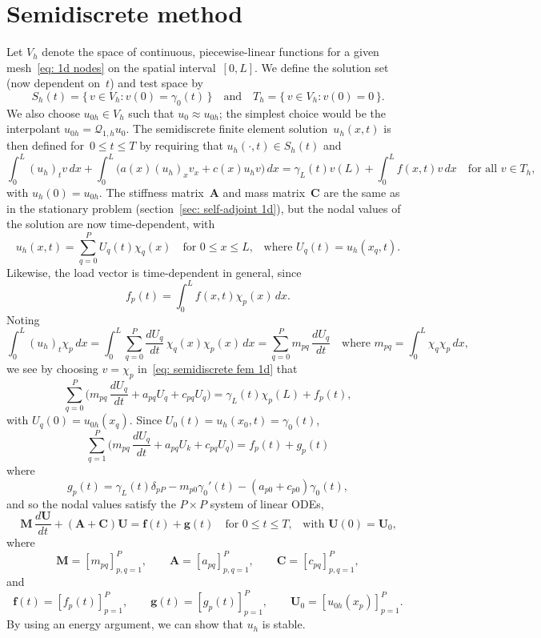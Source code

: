 \section{Semidiscrete method}\label{sec: semidiscrete parabolic FEM}
Let $V_h$ denote the space of continuous, piecewise-linear functions for a 
given mesh~\eqref{eq: 1d nodes} on the spatial interval~$[0,L]$.  We define the 
solution set (now dependent on~$t$) and test space by
\[
S_h(t)=\{\,v\in V_h:v(0)=\gamma_0(t)\,\}
\quad\text{and}\quad
T_h=\{\,v\in V_h:v(0)=0\,\}.
\]
We also choose $u_{0h}\in V_h$ such that $u_0\approx u_{0h}$; the simplest 
choice would be the interpolant $u_{0h}=\mathcal{Q}_{1,h}u_0$. The semidiscrete
finite element solution~$u_h(x,t)$ is then defined for~$0\le t\le T$ by 
requiring that $u_h(\cdot,t)\in S_h(t)$ and
\begin{equation}\label{eq: semidiscrete fem 1d}
\int_0^L(u_h)_tv\,dx+\int_0^L\bigl(a(x)(u_h)_xv_x+c(x)u_hv\bigr)\,dx
    =\gamma_L(t)v(L)+\int_0^Lf(x,t)v\,dx
\quad\text{for all $v\in T_h$,}
\end{equation}
with $u_h(0)=u_{0h}$. The stiffness matrix~$\boldsymbol{A}$ and mass 
matrix~$\boldsymbol{C}$ are the same as in the stationary problem 
(section~\ref{sec: self-adjoint 1d}), but the nodal 
values of the solution are now time-dependent, with
\[
u_h(x,t)=\sum_{q=0}^P U_q(t)\chi_q(x)\quad\text{for $0\le x\le L$,}\quad
\text{where $U_q(t)=u_h(x_q,t)$.}
\]
Likewise, the load vector is time-dependent in general, since 
\[
f_p(t)=\int_0^Lf(x,t)\chi_p(x)\,dx.
\]
Noting 
\[
\int_0^L(u_h)_t\chi_p\,dx=\int_0^L\sum_{q=0}^P
    \frac{dU_q}{dt}\,\chi_q(x)\chi_p(x)\,dx=\sum_{q=0}^P m_{pq}\,\frac{dU_q}{dt}
    \quad\text{where $m_{pq}=\int_0^L\chi_q\chi_p\,dx$,}
\]
we see by choosing $v=\chi_p$ in~\eqref{eq: semidiscrete fem 1d} that
\[
\sum_{q=0}^P\biggl(m_{pq}\,\frac{dU_q}{dt}+a_{pq}U_q+c_{pq}U_q\biggr)
    =\gamma_L(t)\chi_p(L)+f_p(t),
\]
with $U_q(0)=u_{0h}(x_q)$.  Since $U_0(t)=u_h(x_0,t)=\gamma_0(t)$,
\[
\sum_{q=1}^P\biggl(m_{pq}\,\frac{dU_q}{dt}+a_{pq}U_k+c_{pq}U_q\biggr)
    =f_p(t)+g_p(t)
\]
where
\[
g_p(t)=\gamma_L(t)\delta_{pP}-m_{p0}\gamma_0'(t)-(a_{p0}+c_{p0})\gamma_0(t),
\]
and so the nodal values satisfy the $P\times P$ system of linear ODEs,
\begin{equation}\label{eq: semidiscrete fem 1d ODE}
\boldsymbol{M}\,\frac{d\boldsymbol{U}}{dt}
+(\boldsymbol{A}+\boldsymbol{C})\boldsymbol{U}=\boldsymbol{f}(t)
    +\boldsymbol{g}(t)\quad\text{for $0\le t\le T$,}
    \quad\text{with $\boldsymbol{U}(0)=\boldsymbol{U}_0$,}
\end{equation}
where 
\[
\boldsymbol{M}=[m_{pq}]_{p,q=1}^P,\qquad 
\boldsymbol{A}=[a_{pq}]_{p,q=1}^P,\qquad
\boldsymbol{C}=[c_{pq}]_{p,q=1}^P,
\]
and
\[
\boldsymbol{f}(t)=[f_p(t)]_{p=1}^P,\qquad
\boldsymbol{g}(t)=[g_p(t)]_{p=1}^P,\qquad
\boldsymbol{U}_0=[u_{0h}(x_p)]_{p=1}^P.
\]
By using an energy argument, we can show that $u_h$ is stable.

